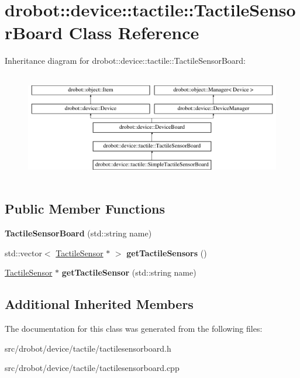 \hypertarget{classdrobot_1_1device_1_1tactile_1_1TactileSensorBoard}{\section{drobot\-:\-:device\-:\-:tactile\-:\-:Tactile\-Sensor\-Board Class Reference}
\label{classdrobot_1_1device_1_1tactile_1_1TactileSensorBoard}
}
Inheritance diagram for drobot\-:\-:device\-:\-:tactile\-:\-:Tactile\-Sensor\-Board\-:\begin{figure}[H]
\begin{center}
\leavevmode
\includegraphics[height=4.778157cm]{classdrobot_1_1device_1_1tactile_1_1TactileSensorBoard}
\end{center}
\end{figure}
\subsection*{Public Member Functions}
\begin{DoxyCompactItemize}
\item 
\hypertarget{classdrobot_1_1device_1_1tactile_1_1TactileSensorBoard_afe6aa518491c12cfe7f11011473bea0c}{{\bfseries Tactile\-Sensor\-Board} (std\-::string name)}\label{classdrobot_1_1device_1_1tactile_1_1TactileSensorBoard_afe6aa518491c12cfe7f11011473bea0c}

\item 
\hypertarget{classdrobot_1_1device_1_1tactile_1_1TactileSensorBoard_a5663bddd91d2fc3c54f00a5a7a10d91f}{std\-::vector$<$ \hyperlink{classdrobot_1_1device_1_1tactile_1_1TactileSensor}{Tactile\-Sensor} $\ast$ $>$ {\bfseries get\-Tactile\-Sensors} ()}\label{classdrobot_1_1device_1_1tactile_1_1TactileSensorBoard_a5663bddd91d2fc3c54f00a5a7a10d91f}

\item 
\hypertarget{classdrobot_1_1device_1_1tactile_1_1TactileSensorBoard_a1fe8a3ffa05557b3069a789090f2bc61}{\hyperlink{classdrobot_1_1device_1_1tactile_1_1TactileSensor}{Tactile\-Sensor} $\ast$ {\bfseries get\-Tactile\-Sensor} (std\-::string name)}\label{classdrobot_1_1device_1_1tactile_1_1TactileSensorBoard_a1fe8a3ffa05557b3069a789090f2bc61}

\end{DoxyCompactItemize}
\subsection*{Additional Inherited Members}


The documentation for this class was generated from the following files\-:\begin{DoxyCompactItemize}
\item 
src/drobot/device/tactile/tactilesensorboard.\-h\item 
src/drobot/device/tactile/tactilesensorboard.\-cpp\end{DoxyCompactItemize}
